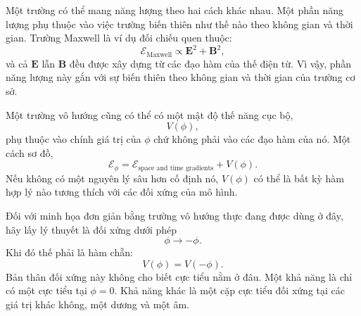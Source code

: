 \begin{classroomqa}
\end{classroomqa}

\begin{classroomqa}
\end{classroomqa}

Một trường có thể mang năng lượng theo hai cách khác nhau. Một phần năng lượng phụ thuộc vào việc trường biến thiên như thế nào theo không gian và thời gian. Trường Maxwell là ví dụ đối chiếu quen thuộc:
\begin{equation}
\mathcal{E}_{\mathrm{Maxwell}}\propto \mathbf E^2+\mathbf B^2,
\end{equation}
và cả \(\mathbf E\) lẫn \(\mathbf B\) đều được xây dựng từ các đạo hàm của thế điện từ. Vì vậy, phần năng lượng này gắn với sự biến thiên theo không gian và thời gian của trường cơ sở.

Một trường vô hướng cũng có thể có một mật độ thế năng cục bộ,
\begin{equation}
V(\phi),
\end{equation}
phụ thuộc vào chính giá trị của \(\phi\) chứ không phải vào các đạo hàm của nó. Một cách sơ đồ,
\begin{equation}
\mathcal{E}_\phi
=
\mathcal E_{\text{space and time gradients}}+V(\phi).
\end{equation}
Nếu không có một nguyên lý sâu hơn cố định nó, \(V(\phi)\) có thể là bất kỳ hàm hợp lý nào tương thích với các đối xứng của mô hình.

Đối với minh họa đơn giản bằng trường vô hướng thực đang được dùng ở đây, hãy lấy lý thuyết là đối xứng dưới phép
\begin{equation}
\phi\longrightarrow-\phi.
\end{equation}
Khi đó thế phải là hàm chẵn:
\begin{equation}
V(\phi)=V(-\phi).
\end{equation}
Bản thân đối xứng này không cho biết cực tiểu nằm ở đâu. Một khả năng là chỉ có một cực tiểu tại \(\phi=0\). Khả năng khác là một cặp cực tiểu đối xứng tại các giá trị khác không, một dương và một âm.


